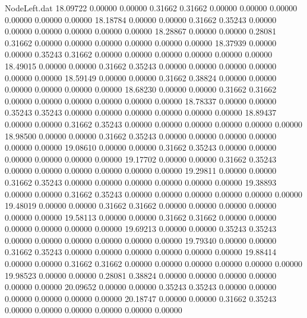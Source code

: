 \begin{filecontents}{NodeLeft.dat}
  18.09722    0.00000    0.00000     0.31662    0.31662    0.00000    0.00000    0.00000    0.00000    0.00000    0.00000
  18.18784    0.00000    0.00000     0.31662    0.35243    0.00000    0.00000    0.00000    0.00000    0.00000    0.00000
  18.28867    0.00000    0.00000     0.28081    0.31662    0.00000    0.00000    0.00000    0.00000    0.00000    0.00000
  18.37939    0.00000    0.00000     0.35243    0.31662    0.00000    0.00000    0.00000    0.00000    0.00000    0.00000
  18.49015    0.00000    0.00000     0.31662    0.35243    0.00000    0.00000    0.00000    0.00000    0.00000    0.00000
  18.59149    0.00000    0.00000     0.31662    0.38824    0.00000    0.00000    0.00000    0.00000    0.00000    0.00000
  18.68230    0.00000    0.00000     0.31662    0.31662    0.00000    0.00000    0.00000    0.00000    0.00000    0.00000
  18.78337    0.00000    0.00000     0.35243    0.35243    0.00000    0.00000    0.00000    0.00000    0.00000    0.00000
  18.89437    0.00000    0.00000     0.31662    0.35243    0.00000    0.00000    0.00000    0.00000    0.00000    0.00000
  18.98500    0.00000    0.00000     0.31662    0.35243    0.00000    0.00000    0.00000    0.00000    0.00000    0.00000
  19.08610    0.00000    0.00000     0.31662    0.35243    0.00000    0.00000    0.00000    0.00000    0.00000    0.00000
  19.17702    0.00000    0.00000     0.31662    0.35243    0.00000    0.00000    0.00000    0.00000    0.00000    0.00000
  19.29811    0.00000    0.00000     0.31662    0.35243    0.00000    0.00000    0.00000    0.00000    0.00000    0.00000
  19.38893    0.00000    0.00000     0.31662    0.35243    0.00000    0.00000    0.00000    0.00000    0.00000    0.00000
  19.48019    0.00000    0.00000     0.31662    0.31662    0.00000    0.00000    0.00000    0.00000    0.00000    0.00000
  19.58113    0.00000    0.00000     0.31662    0.31662    0.00000    0.00000    0.00000    0.00000    0.00000    0.00000
  19.69213    0.00000    0.00000     0.35243    0.35243    0.00000    0.00000    0.00000    0.00000    0.00000    0.00000
  19.79340    0.00000    0.00000     0.31662    0.35243    0.00000    0.00000    0.00000    0.00000    0.00000    0.00000
  19.88414    0.00000    0.00000     0.31662    0.31662    0.00000    0.00000    0.00000    0.00000    0.00000    0.00000
  19.98523    0.00000    0.00000     0.28081    0.38824    0.00000    0.00000    0.00000    0.00000    0.00000    0.00000
  20.09652    0.00000    0.00000     0.35243    0.35243    0.00000    0.00000    0.00000    0.00000    0.00000    0.00000
  20.18747    0.00000    0.00000     0.31662    0.35243    0.00000    0.00000    0.00000    0.00000    0.00000    0.00000

\end{filecontents}
